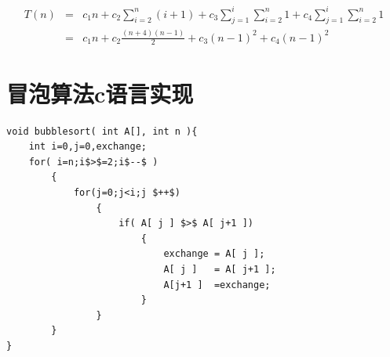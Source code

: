 \documentclass[10pt,a4paper,UTF8]{article}
\begin{document}
\begin{eqnarray}
\label{eq:1}
  T(n) &=& c_1n + c_2\sum_{i=2}^n(i+1) + c_3\sum_{j=1}^i\sum_{i=2}^{n}1 + c_4\sum_{j=1}^i\sum_{i=2}^{n}1 \\
       &=& c_1n + c_2 \frac{(n+4)(n-1)}{2} + c_3(n-1)^2 + c_4(n-1)^2
\end{eqnarray}
\section{冒泡算法c语言实现}
\label{sec:orgdf06c46}


\lstset{language=C,label= ,caption= ,captionpos=b,firstnumber=1,numbers=left}
\begin{lstlisting}
void bubblesort( int A[], int n ){
    int i=0,j=0,exchange;
    for( i=n;i$>$=2;i$--$ )
        {
            for(j=0;j<i;j $++$)
                {
                    if( A[ j ] $>$ A[ j+1 ])
                        {
                            exchange = A[ j ];
                            A[ j ]   = A[ j+1 ];
                            A[j+1 ]  =exchange;
                        }
                }
        }
}
\end{lstlisting}
\end{document}
